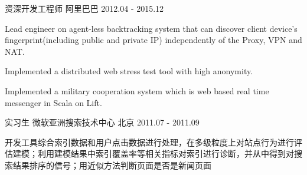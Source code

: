\begin{cventries}
  \cventry
    {资深开发工程师} %
    {阿里巴巴} %
    {} %
    {2012.04 - 2015.12} %
    {
      \begin{cvitems} %
        \item {Lead engineer on agent-less backtracking system that can discover client device's fingerprint(including public and private IP) independently of the Proxy, VPN and NAT.}
        \item {Implemented a distributed web stress test tool with high anonymity.}
        \item {Implemented a military cooperation system which is web based real time messenger in Scala on Lift.}
      \end{cvitems}
    }

  \cventry
    {实习生} %
    {微软亚洲搜索技术中心} %
    {北京} %
    {2011.07 - 2011.09} %
    {
      \begin{cvitems} %
        \item {开发工具综合索引数据和用户点击数据进行处理，在多级粒度上对站点行为进行评估建模；利用建模结果中索引覆盖率等相关指标对索引进行诊断，并从中得到对搜索结果排序的信号；用近似方法判断页面是否是新闻页面}
      \end{cvitems}
    }

\end{cventries}
